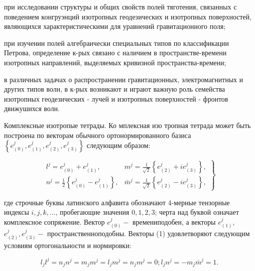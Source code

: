\documentclass[10pt]{article}
\begin{document}
при исследовании структуры и общих свойств полей тяготения, связанных с поведением конгруэнций изотропных геодезических и изотропных поверхностей, являющихся характеристическими для уравнений гравитационного поля;



при изучении полей алгебраически специальных типов по классификации Петрова, определение к-рых связано с наличием в пространстве-времени изотропных направлений, выделяемых кривизной пространства-времени;



в различных задачах о распространении гравитационных, электромагнитных и других типов волн, в к-рых возникают и играют важную роль семейства изотропных геодезических - лучей и изотропных поверхностей - фронтов движушихся волн.



Комплексные изотропые тетрады. Ко мплексная изо тропная тетрада может быть построена по векторам обычного ортонормированного базиса $\left\{e_{(0)}^{j}, e_{(1)}^{j}, e_{(2)}^{j}, e_{(3)}^{j}\right\}$ следующим образом:



\[

\left.\begin{array}{ll}

l^{j}=e_{(0)}^{j}+e_{(1)}^{j}, & m^{j}=\frac{1}{\sqrt{2}}\left\{e_{(2)}^{j}+i e_{(3)}^{j}\right\}, \\

n^{j}=\frac{1}{2}\left\{e_{(0)}^{j}-e_{(1)}^{j}\right\}, & \bar{m}^{j}=\frac{1}{\sqrt{2}}\left\{e_{(2)}^{j}-i e_{(3)}^{j}\right\},

\end{array}\right\}

\]



где строчные буквы латинского алфавита обозначают 4-мерные тензорные индексы $i, j, k, \ldots$, пробегающие значения $0,1,2,3$; черта над буквой означает комплексное сопряжение. Вектор $e_{(0)}^{j}-$ времениподобен, а векторы $e_{(1)}^{j}$, $e_{(2)}^{j}, e_{(3)}^{j}-$ пространственноподобны. Векторы (1) удовлетворяют следующим условиям ортогональности и нормировки:



\[

l_{j} l^{j}=n_{j} n^{j}=m_{j} m^{j}=l_{j} m^{j}=n_{j} m^{j}=0 ; l_{j} n^{j}=-m_{j} \bar{m}^{j}=1 .

\]
\end{document}
